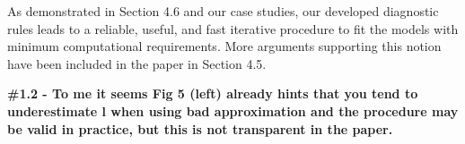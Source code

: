 \documentclass[11pt]{report}
\begin{document}
As demonstrated in Section 4.6 and our case studies, our developed diagnostic rules leads to a reliable, useful, and fast iterative procedure to fit the models with minimum computational requirements. More arguments supporting this notion have been included in the paper in Section 4.5. 






\textbf{\#1.2 - To me it seems Fig 5 (left) already hints that you tend to underestimate l when using bad approximation and the procedure may be valid in practice, but this is not transparent in the paper.}
\end{document}

